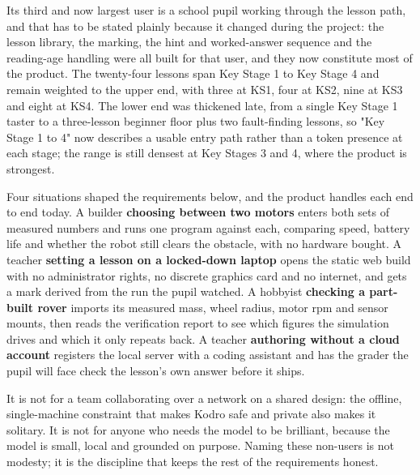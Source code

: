 \documentclass[11pt,a4paper]{report}
\begin{document}
 Its third and now largest user is a school pupil working through the lesson path, and that has to be stated plainly because it changed during the project: the lesson library, the marking, the hint and worked-answer sequence and the reading-age handling were all built for that user, and they now constitute most of the product. The twenty-four lessons span Key Stage 1 to Key Stage 4 and remain weighted to the upper end, with three at KS1, four at KS2, nine at KS3 and eight at KS4. The lower end was thickened late, from a single Key Stage 1 taster to a three-lesson beginner floor plus two fault-finding lessons, so "Key Stage 1 to 4" now describes a usable entry path rather than a token presence at each stage; the range is still densest at Key Stages 3 and 4, where the product is strongest.

  Four situations shaped the requirements below, and the product handles each end to end today. A builder \textbf{choosing between two motors} enters both sets of measured numbers and runs one program against each, comparing speed, battery life and whether the robot still clears the obstacle, with no hardware bought. A teacher \textbf{setting a lesson on a locked-down laptop} opens the static web build with no administrator rights, no discrete graphics card and no internet, and gets a mark derived from the run the pupil watched. A hobbyist \textbf{checking a part-built rover} imports its measured mass, wheel radius, motor rpm and sensor mounts, then reads the verification report to see which figures the simulation drives and which it only repeats back. A teacher \textbf{authoring without a cloud account} registers the local server with a coding assistant and has the grader the pupil will face check the lesson's own answer before it ships.

 It is not for a team collaborating over a network on a shared design: the offline, single-machine constraint that makes Kodro safe and private also makes it solitary. It is not for anyone who needs the model to be brilliant, because the model is small, local and grounded on purpose. Naming these non-users is not modesty; it is the discipline that keeps the rest of the requirements honest.
\end{document}
